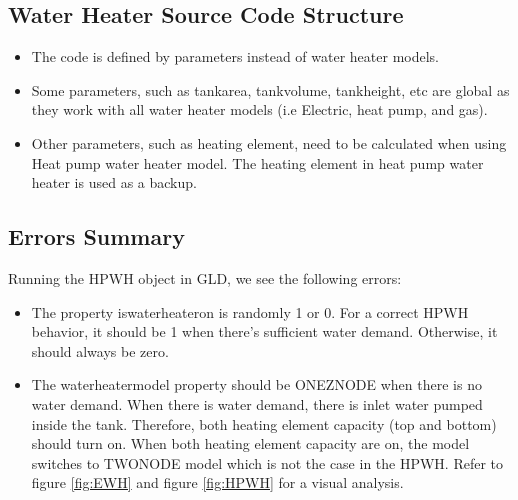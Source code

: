 \subsection{Water Heater Source Code Structure}
\begin{itemize}
    \item The code is defined by parameters instead of water heater models. 
    \item Some parameters, such as tank\textunderscore area, tank\textunderscore volume, tank\textunderscore height, etc are global as they work with all water heater models (i.e Electric, heat pump, and gas).
    \item Other parameters, such as heating element, need to be calculated when using Heat pump water heater model. The heating element in heat pump water heater is used as a backup.
\end{itemize}
\subsection{Errors Summary}
Running the HPWH object in GLD, we see the following errors:
\begin{itemize}
    \item The property is\textunderscore waterheater\textunderscore on is randomly 1 or 0. For a correct HPWH behavior, it should be 1 when there's sufficient water demand. Otherwise, it should always be zero.
    \item The waterheater\textunderscore model property should be ONEZNODE when there is no water demand. When there is water demand, there is inlet water pumped inside the tank. Therefore, both heating element capacity (top and bottom) should turn on. When both heating element capacity are on, the model switches to TWONODE model which is not the case in the HPWH. Refer to figure \ref{fig:EWH} and figure \ref{fig:HPWH} for a visual analysis.
\end{itemize}
